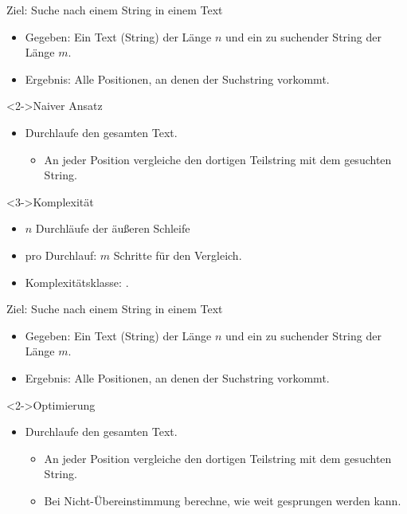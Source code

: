 \begin{frame}
    \begin{block}{Ziel: Suche nach einem String in einem Text}
        \begin{itemize}
            \item Gegeben: Ein Text (String) der Länge $n$ und ein zu suchender String der Länge $m$.
            \item Ergebnis: Alle Positionen, an denen der Suchstring vorkommt.
        \end{itemize}
    \end{block}
    \begin{block}<2->{Naiver Ansatz}
        \begin{itemize}
            \item Durchlaufe den gesamten Text.
            \begin{itemize}
                \item An jeder Position vergleiche den dortigen Teilstring mit dem gesuchten String.
            \end{itemize}
        \end{itemize}
    \end{block}
    \begin{block}<3->{Komplexität}
        \begin{itemize}
            \item $n$ Durchläufe der äußeren Schleife
            \item pro Durchlauf: $m$ Schritte für den Vergleich.
            \item Komplexitätsklasse: .
        \end{itemize}
    \end{block}
\end{frame}

\begin{frame}
    \begin{block}{Ziel: Suche nach einem String in einem Text}
        \begin{itemize}
            \item Gegeben: Ein Text (String) der Länge $n$ und ein zu suchender String der Länge $m$.
            \item Ergebnis: Alle Positionen, an denen der Suchstring vorkommt.
        \end{itemize}
    \end{block}
    \begin{block}<2->{Optimierung}
        \begin{itemize}
            \item Durchlaufe den gesamten Text.
            \begin{itemize}
                \item An jeder Position vergleiche den dortigen Teilstring mit dem gesuchten String.
                \item Bei Nicht-Übereinstimmung berechne, wie weit gesprungen werden kann.
            \end{itemize}
        \end{itemize}
    \end{block}
\end{frame}

